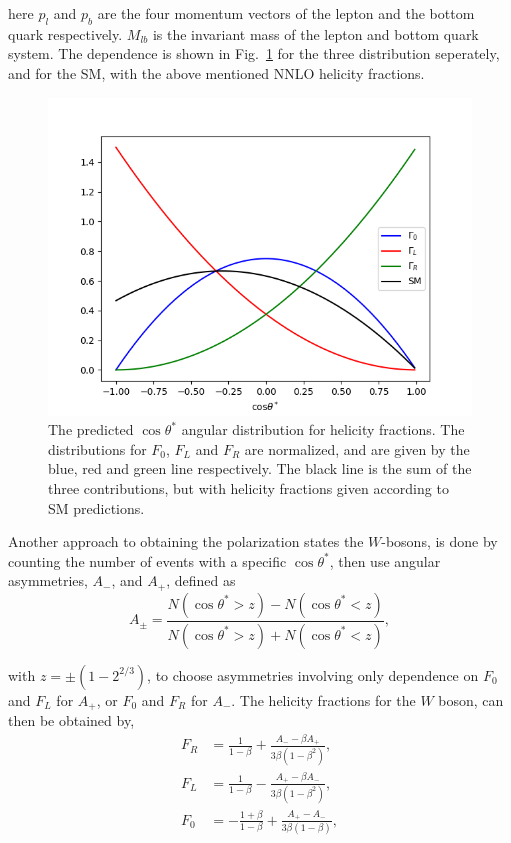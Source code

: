\documentclass[12pt,a4paper]{article}
\numberwithin{equation}{section}
\begin{document}
here $p_l$ and $p_b$ are the four momentum vectors of the lepton and the bottom
quark respectively. $M_{lb}$ is the invariant mass of the lepton and bottom
quark system. The dependence is shown in Fig.~\ref{fig:distributions} for the
three distribution seperately, and for the SM, with the above mentioned NNLO
helicity fractions.
\begin{figure}[H]
  \centering
	\includegraphics[width=0.7\linewidth]{figures/angular_dist.png}
	\caption{The predicted $\cos \theta^{*}$ angular distribution for helicity
    fractions. The distributions for $F_{0}$, $F_{L}$ and $F_{R}$ are
    normalized, and are given by the blue, red and green line respectively. The
    black line is the sum of the three contributions, but with helicity
    fractions given according to SM predictions.}\label{fig:distributions}
\end{figure}

Another approach to obtaining the polarization states the $W$-bosons, is done by
counting the number of events with a specific $\cos \theta^*$, then use angular
asymmetries, $A_-$, and $A_+$, defined as
\begin{equation}\label{eq:asymmetries}
  A_{\pm}=\frac{N(\cos \theta^* > z)-N(\cos \theta^* < z)}{N(\cos \theta^* > z)+N(\cos \theta^* < z)},
\end{equation}

with $z=\pm(1-2^{2/3})$, to choose asymmetries involving only dependence on
$F_0$ and $F_L$ for $A_+$, or $F_0$ and $F_R$ for $A_-$. The helicity fractions
for the $W$ boson, can then be obtained by,
\begin{align}
  F_R&=\frac{1}{1-\beta}+\frac{A_- - \beta A_+}{3\beta (1-\beta^2)},\\
  F_L&=\frac{1}{1-\beta}-\frac{A_+ - \beta A_-}{3\beta (1-\beta^2)},\\
  F_0&=-\frac{1+\beta}{1-\beta}+\frac{A_+ - A_-}{3\beta (1-\beta)},
\end{align}
\end{document}
